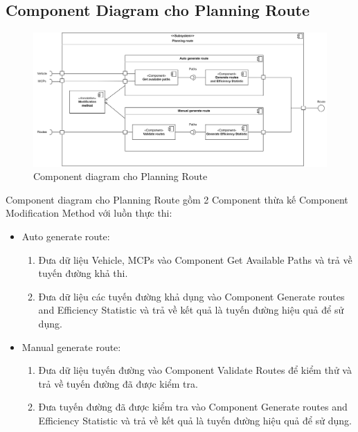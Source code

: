     \subsection{Component Diagram cho Planning Route}
        \begin{figure}[h]
            \centering
            \includegraphics[width=1\linewidth]{imgs/Component diagram/Component planning route.png}
            \caption{Component diagram cho Planning Route}
        \end{figure}
        Component diagram cho Planning Route gồm 2 Component thừa kế Component Modification Method với luồn thực thi:
        \begin{itemize}
            \item Auto generate route:
            \begin{enumerate}
                \item Đưa dữ liệu Vehicle, MCPs vào Component Get Available Paths và trả về tuyến đường khả thi.
                \item Đưa dữ liệu các tuyến đường khả dụng vào Component Generate routes and Efficiency Statistic và trả về kết quả là tuyến đường hiệu quả để sử dụng.
            \end{enumerate}

            \item Manual generate route:
            \begin{enumerate}
                \item Đưa dữ liệu tuyến đường vào Component Validate Routes để kiểm thử và trả về tuyến đường đã được kiểm tra.
                \item Đưa tuyến đường đã được kiểm tra vào Component Generate routes and Efficiency Statistic và trả về kết quả là tuyến đường hiệu quả để sử dụng.
            \end{enumerate}
        \end{itemize}
       
       
